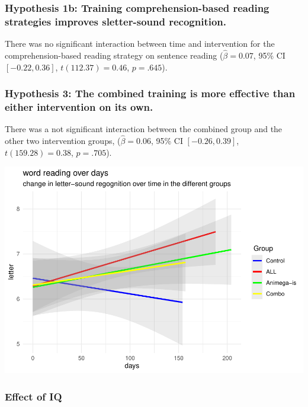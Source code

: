 \documentclass[
  english,
  ,man]{apa6}
\begin{document}
\hypertarget{hypothesis-1b-training-comprehension-based-reading-strategies-improves-sletter-sound-recognition.}{%
\subsubsection{Hypothesis 1b: Training comprehension-based reading strategies improves sletter-sound recognition.}\label{hypothesis-1b-training-comprehension-based-reading-strategies-improves-sletter-sound-recognition.}}

There was no significant interaction between time and intervention for the comprehension-based reading strategy on sentence reading (\(\hat{\beta} = 0.07\), 95\% CI \([-0.22, 0.36]\), \(t(112.37) = 0.46\), \(p = .645\)).

\hypertarget{hypothesis-3-the-combined-training-is-more-effective-than-either-intervention-on-its-own.-3}{%
\subsubsection{Hypothesis 3: The combined training is more effective than either intervention on its own.}\label{hypothesis-3-the-combined-training-is-more-effective-than-either-intervention-on-its-own.-3}}

There was a not significant interaction between the combined group and the other two intervention groups, (\(\hat{\beta} = 0.06\), 95\% CI \([-0.26, 0.39]\), \(t(159.28) = 0.38\), \(p = .705\)).

\includegraphics{Effects_of_training_files/figure-latex/letter-plot-1.pdf}

\hypertarget{effect-of-iq-3}{%
\subsubsection{Effect of IQ}\label{effect-of-iq-3}}
\end{document}
